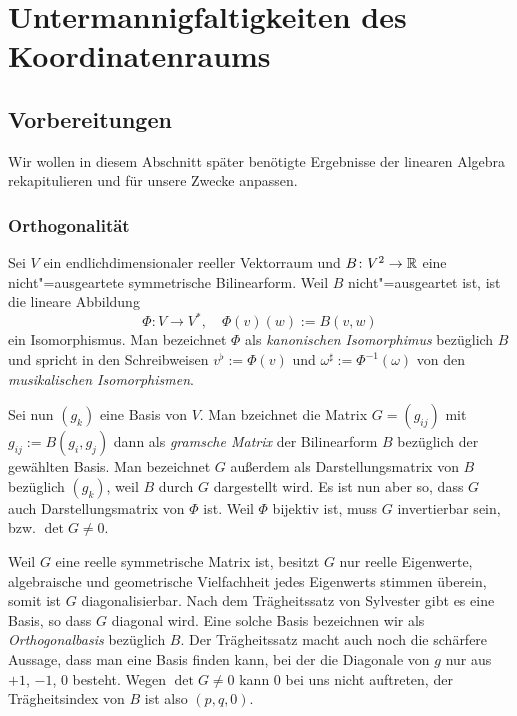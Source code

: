 
\chapter{Untermannigfaltigkeiten des Koordinatenraums}

\section{Vorbereitungen}

Wir wollen in diesem Abschnitt später benötigte Ergebnisse der
linearen Algebra rekapitulieren und für unsere Zwecke anpassen.

\subsection{Orthogonalität}

Sei $V$ ein endlichdimensionaler reeller Vektorraum und
$B\colon V^2\to\mathbb R$ eine nicht"=ausgeartete symmetrische Bilinearform.
Weil $B$ nicht"=ausgeartet ist, ist die lineare Abbildung%
\begin{equation}
\Phi\colon V\to V^*,\quad \Phi(v)(w):=B(v,w)
\end{equation}
ein Isomorphismus. Man bezeichnet $\Phi$ als
\emph{kanonischen Isomorphimus}
bezüglich $B$ und spricht in den Schreibweisen $v^\flat:=\Phi(v)$
und $\omega^\sharp:=\Phi^{-1}(\omega)$ von den \emph{musikalischen
Isomorphismen}.

Sei nun $(g_k)$ eine Basis von $V$. Man bzeichnet die Matrix
$G=(g_{ij})$ mit $g_{ij}:=B(g_i,g_j)$ dann als
\emph{gramsche Matrix}
der Bilinearform $B$ bezüglich der gewählten Basis. Man bezeichnet
$G$ außerdem als Darstellungsmatrix von $B$ bezüglich $(g_k)$,
weil $B$ durch $G$ dargestellt wird. Es ist nun aber so, dass
$G$ auch Darstellungsmatrix von $\Phi$ ist. Weil $\Phi$ bijektiv
ist, muss $G$ invertierbar sein, bzw. $\det G\ne 0$.

Weil $G$ eine reelle symmetrische Matrix ist, besitzt $G$ nur reelle
Eigenwerte, algebraische und geometrische Vielfachheit jedes
Eigenwerts stimmen überein, somit ist $G$ diagonalisierbar.
Nach dem Trägheitssatz von Sylvester gibt es eine Basis, so
dass $G$ diagonal wird. Eine solche Basis bezeichnen wir als
\emph{Orthogonalbasis} bezüglich $B$. Der Trägheitssatz macht auch
noch die schärfere Aussage, dass man eine Basis finden kann, bei der
die Diagonale von $g$ nur aus $+1$, $-1$, $0$ besteht. Wegen
$\det G\ne 0$ kann $0$ bei uns nicht auftreten, der Trägheitsindex von
$B$ ist also $(p,q,0)$.

